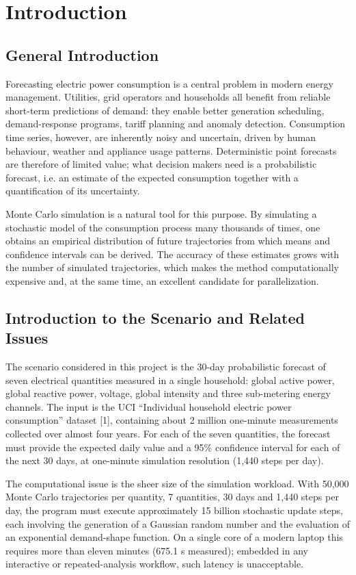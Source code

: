 \documentclass[12pt,a4paper]{article}
\begin{document}
\section{Introduction}\label{introduction}
\subsection{General Introduction}\label{general-introduction}

Forecasting electric power consumption is a central problem in modern
energy management. Utilities, grid operators and households all benefit
from reliable short-term predictions of demand: they enable better
generation scheduling, demand-response programs, tariff planning and
anomaly detection. Consumption time series, however, are inherently
noisy and uncertain, driven by human behaviour, weather and appliance
usage patterns. Deterministic point forecasts are therefore of limited
value; what decision makers need is a probabilistic forecast, i.e. an
estimate of the expected consumption together with a quantification of
its uncertainty.

Monte Carlo simulation is a natural tool for this purpose. By simulating
a stochastic model of the consumption process many thousands of times,
one obtains an empirical distribution of future trajectories from which
means and confidence intervals can be derived. The accuracy of these
estimates grows with the number of simulated trajectories, which makes
the method computationally expensive and, at the same time, an excellent
candidate for parallelization.

\subsection{Introduction to the Scenario and Related Issues}

The scenario considered in this project is the 30-day probabilistic
forecast of seven electrical quantities measured in a single household:
global active power, global reactive power, voltage, global intensity
and three sub-metering energy channels. The input is the UCI
``Individual household electric power consumption'' dataset [{1}],
containing about 2 million one-minute measurements collected over almost
four years. For each of the seven quantities, the forecast must provide
the expected daily value and a 95\% confidence interval for each of the
next 30 days, at one-minute simulation resolution (1,440 steps per day).

The computational issue is the sheer size of the simulation workload.
With 50,000 Monte Carlo trajectories per quantity, 7 quantities, 30 days
and 1,440 steps per day, the program must execute approximately 15
billion stochastic update steps, each involving the generation of a
Gaussian random number and the evaluation of an exponential demand-shape
function. On a single core of a modern laptop this requires more than
eleven minutes (675.1 s measured); embedded in any interactive or
repeated-analysis workflow, such latency is unacceptable.
\end{document}
